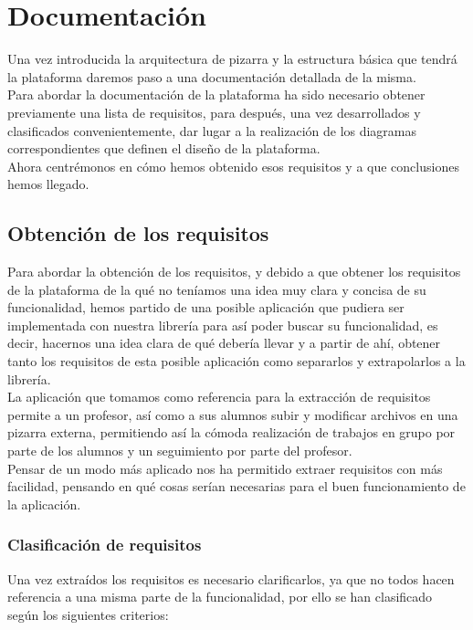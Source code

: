 \chapter{Documentación}
\lettrine[lines=1,slope=4pt,findent=0pt]{U}{}na vez introducida la arquitectura de pizarra y la estructura básica que tendrá la plataforma daremos paso a una documentación detallada de la misma.\\

Para abordar la documentación de la plataforma ha sido necesario obtener previamente una lista de requisitos, para después, una vez desarrollados y clasificados convenientemente, dar lugar a la realización de los diagramas  correspondientes que definen el diseño de la plataforma.\\

Ahora centrémonos en cómo hemos obtenido esos requisitos y a que conclusiones hemos llegado.

\section{Obtención de los requisitos}
Para abordar la obtención de los requisitos, y debido a que obtener los requisitos de la plataforma de la qué no teníamos una idea muy clara y concisa de su funcionalidad, hemos partido de una posible aplicación que pudiera ser implementada con nuestra librería para así poder buscar su funcionalidad, es decir, hacernos una idea clara de qué debería llevar y a partir de ahí, obtener tanto los requisitos de esta posible aplicación como separarlos y extrapolarlos a la librería.\\

La aplicación que tomamos como referencia para la extracción de requisitos permite a un profesor, así como a sus alumnos subir y modificar archivos en una pizarra externa, permitiendo así la cómoda realización de trabajos en grupo por parte de los alumnos y un seguimiento por parte del profesor.\\

Pensar de un modo más aplicado nos ha permitido extraer requisitos con más facilidad, pensando en qué cosas serían necesarias para el buen funcionamiento de la aplicación.\\

\subsection{Clasificación de requisitos}
Una vez extraídos los requisitos es necesario clarificarlos, ya que no todos hacen referencia a una misma parte de la funcionalidad, por ello se han clasificado según los siguientes criterios:

